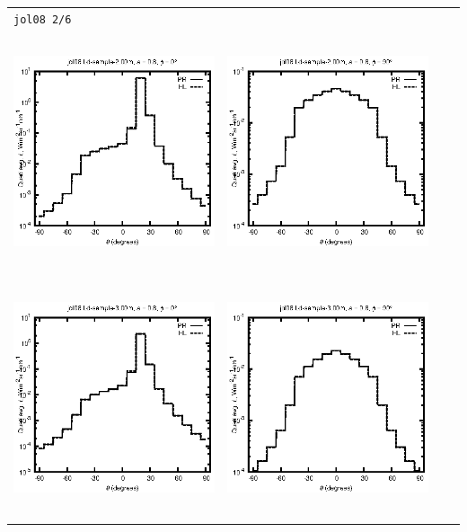 \begin{tabular}{c c c c}
\multicolumn{4}{l}{\texttt{jol08 2/6}} \\
\includegraphics[height=7cm]{../eps/jol08_Ld_sample_2.00m_fwd.eps} &
\includegraphics[height=7cm]{../eps/jol08_Ld_sample_2.00m_cross.eps} \\
\includegraphics[height=7cm]{../eps/jol08_Ld_sample_3.00m_fwd.eps} &
\includegraphics[height=7cm]{../eps/jol08_Ld_sample_3.00m_cross.eps} \\

\end{tabular}
